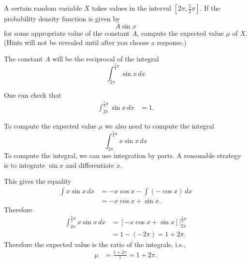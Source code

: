 \documentclass{ximera}
\begin{document}
\begin{question}%
A certain random variable \(X\) takes values in the interval \(\left[2 \pi , \frac{5}{2} \pi \right]\).
If the probability density function is given by
\[ A \sin {x} \]
 for some appropriate value of the constant \(A\),
compute the expected value \(\mu\) of \(X\).  (Hints will not be revealed until after you choose a response.)
\begin{multiplechoice}
\choice{\(\displaystyle \mu = 2 \pi\)}
\end{multiplechoice}
\begin{feedback}
The constant \(A\) will be the reciprocal of the integral
\[ \int_{2 \pi}^{\frac{5}{2} \pi} \sin {x}\, dx \]
\begin{hint}
 One can check that
\[ \begin{aligned} \int_{2 \pi}^{\frac{5}{2} \pi} \sin {x}\, dx & = 1. \end{aligned} \] \begin{hint} 
To compute the expected value \(\mu\) we also need to compute the integral 
\[ \int_{2 \pi}^{\frac{5}{2} \pi} x \sin {x}\, dx \]
 To compute the integral, we can use integration by parts. A reasonable strategy is to integrate  \(\sin {x}\) and differentiate  \(x\). \begin{hint}
 This gives the equality
\[ \begin{aligned} \int x \sin {x}\, dx & = - x \cos {x} - \int \left(- \cos {x}\right)\, dx \\
 & = - x \cos {x} + \sin {x}. \end{aligned} \]
Therefore 
\[ \begin{aligned} \int_{2 \pi}^{\frac{5}{2} \pi} x \sin {x}\, dx & = \left. \left[- x \cos {x} + \sin {x} \right] \right|_{2 \pi}^{\frac{5}{2} \pi}\\ & = 1 - \left(- 2 \pi \right) = 1 + 2 \pi. \end{aligned} \]
Therefore the expected value is the ratio of the integrals, i.e.,
\[ \begin{aligned} \mu & = \frac{1 + 2 \pi}{1} = 1 + 2 \pi. \end{aligned} \]
\end{hint} \end{hint} \end{hint}
\end{feedback}
\end{question}
\end{document}
